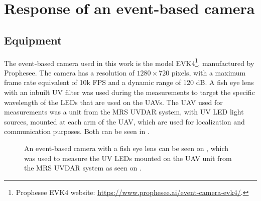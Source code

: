
\chapter{Response of an event-based camera\label{chap:response}}

\section{Equipment}

The event-based camera used in this work is the model EVK4\footnote{Prophesee EVK4 website: \url{https://www.prophesee.ai/event-camera-evk4/}.}, manufactured by Prophesee. The camera has a resolution of
$1280 \times 720$ pixels, with a maximum frame rate equivalent of 10k FPS and a dynamic range of 120 dB.
A fish eye lens with an inbuilt UV filter was used during the measurements to target the specific wavelength of the LEDs
that are used on the UAVs. The UAV used for measurements was a unit from the MRS UVDAR system, with UV \ac{LED} light sources, mounted at each arm of the UAV, which are used for localization and communication purposes.
Both can be seen in .

\begin{figure}[H]
	\centering
	\caption{
  An event-based camera with a fish eye lens can be seen on , which was used to measure the UV LEDs mounted on the UAV unit from the MRS UVDAR system as seen on .
  }
	\label{fig:uavcam}
\end{figure}

